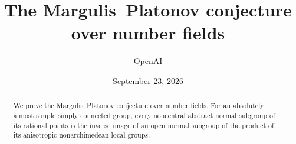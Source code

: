 
\title{The Margulis--Platonov conjecture\\over number fields}
\author{OpenAI}
\date{September 23, 2026}

\maketitle
\begin{abstract}
We prove the Margulis--Platonov conjecture over number fields.
For an absolutely almost simple simply connected group, every noncentral
abstract normal subgroup of its rational points is the inverse image of an
open normal subgroup of the product of its anisotropic nonarchimedean
local groups.
\end{abstract}
\tableofcontents
\clearpage










